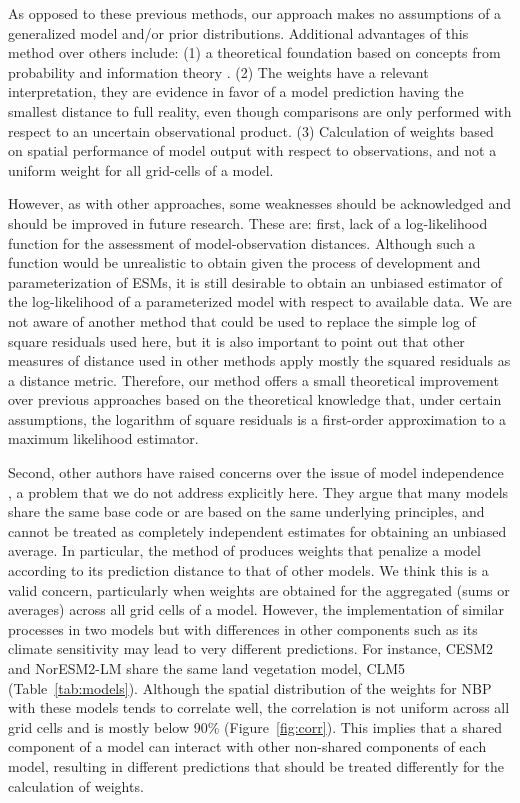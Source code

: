\documentclass[gmd, manuscript]{copernicus}
\begin{document}
As opposed to these previous methods, our approach makes no assumptions of a generalized model and/or prior distributions. 
Additional advantages of this method over others include: (1) a theoretical foundation based on concepts from probability and information theory \citep{Akaike1974, Akaike1981, Anderson2007, Burnham2002}. (2) The weights have a relevant interpretation, they are evidence in favor of a model prediction having the smallest distance to full reality, even though comparisons are only performed with respect to an uncertain observational product. 
(3) Calculation of weights based on spatial performance of model output with respect to observations, and not a uniform weight for all grid-cells of a model.

However, as with other approaches, some weaknesses should be acknowledged and should be improved in future research. These are: first, lack of a log-likelihood function for the assessment of model-observation distances. Although such a function would be unrealistic to obtain given the process of development and parameterization of ESMs, it is still desirable to obtain an unbiased estimator of the log-likelihood of a parameterized model with respect to available data. We are not aware of another method that could be used to replace the simple log of square residuals used here, but it is also important to point out that other measures of distance used in other methods apply mostly the squared residuals as a distance metric. Therefore, our method offers a small theoretical improvement over previous approaches based on the theoretical knowledge that, under certain assumptions, the logarithm of square residuals is a first-order approximation to a maximum likelihood estimator. 

Second, other authors have raised concerns over the issue of model independence \citep{Knutti2010CC, Knutti2010JC}, a problem that we do not address explicitly here. They argue that many models share the same base code or are based on the same underlying principles, and cannot be treated as completely independent estimates for obtaining an unbiased average. In particular, the method of \citet{Knutti2017} produces weights that penalize a model according to its prediction distance to that of other models. We think this is a valid concern, particularly when weights are obtained for the aggregated (sums or averages) across all grid cells of a model. However, the implementation of similar processes in two models but with differences in other components such as its climate sensitivity may lead to very different predictions. For instance, CESM2 and NorESM2-LM share the same land vegetation model, CLM5 (Table~\ref{tab:models}). Although the spatial distribution of the weights for NBP with these models tends to correlate well, the correlation is not uniform across all grid cells and is mostly below 90\% (Figure~\ref{fig:corr}). This implies that a shared component of a model can interact with other non-shared components of each model, resulting in different predictions that should be treated differently for the calculation of weights. 
\end{document}
